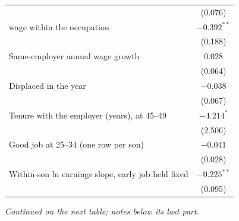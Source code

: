 \begin{table}[!htbp]
{{\begin{tabular}{lc}
 & (0.076) \\
\quad wage within the occupation & $-0.392^{**}$ \\
 & (0.188) \\
Same-employer annual wage growth & $0.028$ \\
 & (0.064) \\
Displaced in the year & $-0.038$ \\
 & (0.067) \\
Tenure with the employer (years), at 45--49 & $-4.214^{*}$ \\
 & (2.506) \\
Good job at 25--34 (one row per son) & $-0.041$ \\
 & (0.028) \\
Within-son ln earnings slope, early job held fixed & $-0.225^{**}$ \\
 & (0.095) \\
\bottomrule
\end{tabular}}}
\par\smallskip
\begin{minipage}{\textwidth}\footnotesize \textit{Continued on the next table; notes below its last part.}\end{minipage}
\end{table}
